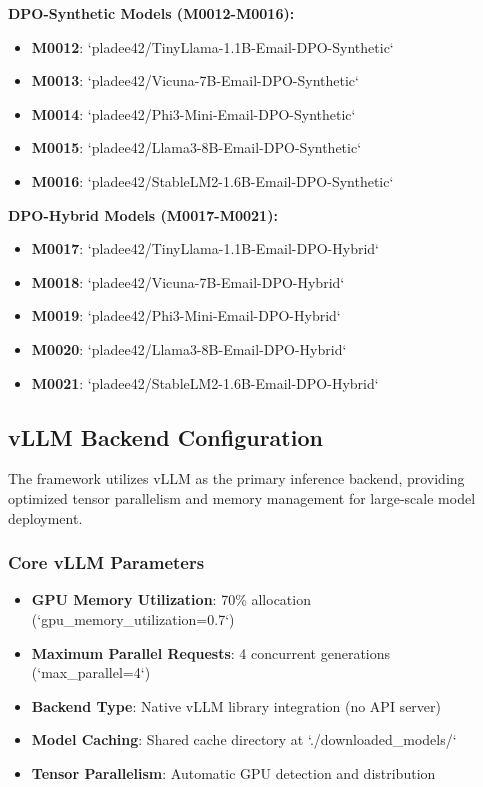 \textbf{DPO-Synthetic Models (M0012-M0016):}
\begin{itemize}
    \item \textbf{M0012}: `pladee42/TinyLlama-1.1B-Email-DPO-Synthetic`
    \item \textbf{M0013}: `pladee42/Vicuna-7B-Email-DPO-Synthetic`
    \item \textbf{M0014}: `pladee42/Phi3-Mini-Email-DPO-Synthetic`
    \item \textbf{M0015}: `pladee42/Llama3-8B-Email-DPO-Synthetic`
    \item \textbf{M0016}: `pladee42/StableLM2-1.6B-Email-DPO-Synthetic`
\end{itemize}

\textbf{DPO-Hybrid Models (M0017-M0021):}
\begin{itemize}
    \item \textbf{M0017}: `pladee42/TinyLlama-1.1B-Email-DPO-Hybrid`
    \item \textbf{M0018}: `pladee42/Vicuna-7B-Email-DPO-Hybrid`
    \item \textbf{M0019}: `pladee42/Phi3-Mini-Email-DPO-Hybrid`
    \item \textbf{M0020}: `pladee42/Llama3-8B-Email-DPO-Hybrid`
    \item \textbf{M0021}: `pladee42/StableLM2-1.6B-Email-DPO-Hybrid`
\end{itemize}

\subsection{vLLM Backend Configuration}
\label{subsec:vllm-configuration}

The framework utilizes vLLM as the primary inference backend, providing optimized tensor parallelism and memory management for large-scale model deployment.

\subsubsection{Core vLLM Parameters}

\begin{itemize}
    \item \textbf{GPU Memory Utilization}: 70\% allocation (`gpu\_memory\_utilization=0.7`)
    \item \textbf{Maximum Parallel Requests}: 4 concurrent generations (`max\_parallel=4`)
    \item \textbf{Backend Type}: Native vLLM library integration (no API server)
    \item \textbf{Model Caching}: Shared cache directory at `./downloaded\_models/`
    \item \textbf{Tensor Parallelism}: Automatic GPU detection and distribution
\end{itemize}

